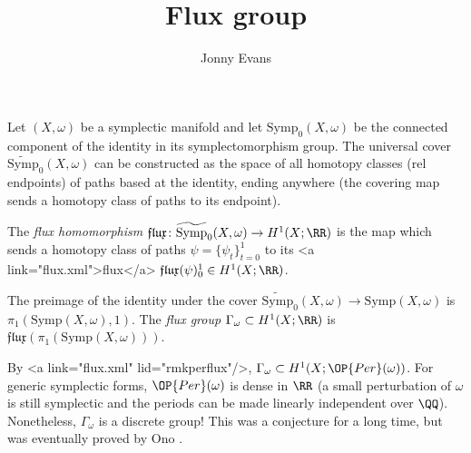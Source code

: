\documentclass{article}
\title{Flux group}
\author{Jonny Evans}
\begin{document}
Let $(X,\omega)$ be a symplectic manifold and let $\mathrm{Symp}_0(X,\omega)$ be the connected component of the identity in its symplectomorphism group. The universal cover $\widetilde{\mathrm{Symp}}_0(X,\omega)$ can be constructed as the space of all homotopy classes (rel endpoints) of paths based at the identity, ending anywhere (the covering map sends a homotopy class of paths to its endpoint).

\begin{Definition}
  The {\em flux homomorphism} $\mathfrak{flux}\colon\widetilde{\mathrm{Symp}}_0(X,\omega)\to H^1(X;\RR)$ is the map which sends a homotopy class of paths $\psi=\{\psi_t\}_{t=0}^1$ to its <a link="flux.xml">flux</a> $\mathfrak{flux}(\psi)_0^1\in H^1(X;\RR)$.
\end{Definition}

The preimage of the identity under the cover $\widetilde{\mathrm{Symp}}_0(X,\omega)\to\mathrm{Symp}(X,\omega)$ is $\pi_1(\mathrm{Symp}(X,\omega),1)$. The {\em flux group} $\Gamma_\omega\subset H^1(X;\RR)$ is $\mathfrak{flux}(\pi_1(\mathrm{Symp}(X,\omega)))$.

\begin{Remark}
  By <a link="flux.xml" lid="rmkperflux"/>, $\Gamma_\omega\subset H^1(X;\OP{Per}(\omega))$. For generic symplectic forms, $\OP{Per}(\omega)$ is dense in $\RR$ (a small perturbation of $\omega$ is still symplectic and the periods can be made linearly independent over $\QQ$). Nonetheless, $\Gamma_\omega$ is a discrete group! This was a conjecture for a long time, but was eventually proved by Ono \cite{Ono}.

\end{Remark}
\end{document}
